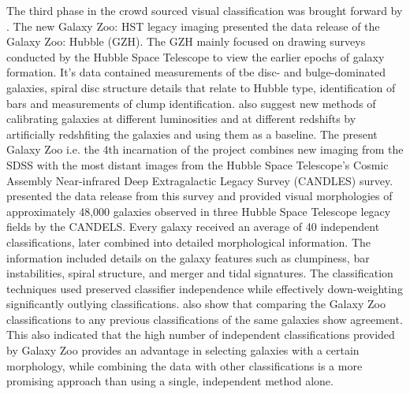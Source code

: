 \documentclass[fleqn,usenatbib]{mnras}
\begin{document}
The third phase in the crowd sourced visual classification was brought forward by \citet{Willet2016HST}. The new Galaxy Zoo: HST legacy imaging presented the data release of the Galaxy Zoo: Hubble (GZH). The GZH mainly focused on drawing surveys conducted by the Hubble Space Telescope to view the earlier epochs of galaxy formation. It's data contained measurements of tbe disc- and bulge-dominated galaxies, spiral disc structure details that relate to Hubble type, identification of bars and measurements of clump identification. \citet{Willet2016HST} also suggest new methods of calibrating galaxies at different luminosities and at different redshifts by artificially redshfiting the galaxies and using them as a baseline. The present Galaxy Zoo i.e. the 4th incarnation of the project combines new imaging from the SDSS with the most distant images from the Hubble Space Telescope's Cosmic Assembly Near-infrared Deep Extragalactic Legacy Survey (CANDLES) survey. \citet{Simmons2016CANDLES} presented the data release from this survey and provided visual morphologies of approximately 48,000 galaxies observed in
three Hubble Space Telescope legacy fields by the CANDELS. Every galaxy received an average of 40 independent classifications, later combined into detailed morphological information. The information included details on the galaxy features such as clumpiness, bar instabilities, spiral structure, and merger and tidal signatures.
The classification techniques used preserved classifier independence while effectively down-weighting significantly outlying classifications. \citet{Simmons2016CANDLES} also show that comparing the Galaxy Zoo classifications to any previous classifications of the same galaxies show agreement. This also indicated that the high number of independent classifications provided by Galaxy Zoo provides an advantage in selecting galaxies with a certain morphology, while combining the data with other classifications is a more promising approach than using a single, independent method alone.
\end{document}
